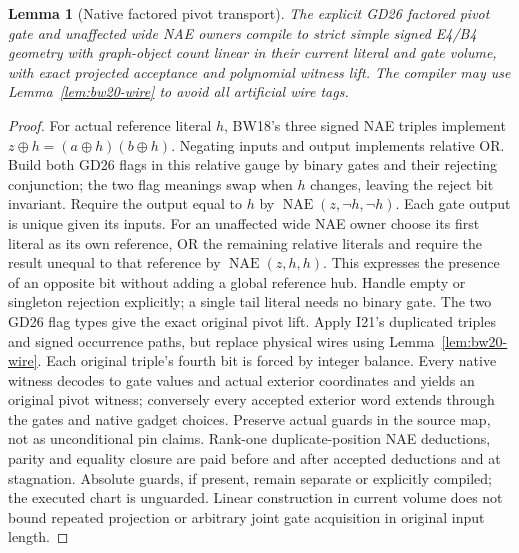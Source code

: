 \documentclass[11pt]{article}
\newtheorem{lemma}[theorem]{Lemma}
\begin{document}
\begin{lemma}[Native factored pivot transport]\label{lem:bw20-gate}
The explicit GD26 factored pivot gate and unaffected wide NAE owners compile to strict simple signed E4/B4 geometry with graph-object count linear in their current literal and gate volume, with exact projected acceptance and polynomial witness lift. The compiler may use Lemma~\ref{lem:bw20-wire} to avoid all artificial wire tags.
\end{lemma}
\begin{proof}
For actual reference literal $h$, BW18's three signed NAE triples implement $z\oplus h=(a\oplus h)(b\oplus h)$. Negating inputs and output implements relative OR. Build both GD26 flags in this relative gauge by binary gates and their rejecting conjunction; the two flag meanings swap when $h$ changes, leaving the reject bit invariant. Require the output equal to $h$ by $\operatorname{NAE}(z,\neg h,\neg h)$. Each gate output is unique given its inputs. For an unaffected wide NAE owner choose its first literal as its own reference, OR the remaining relative literals and require the result unequal to that reference by $\operatorname{NAE}(z,h,h)$. This expresses the presence of an opposite bit without adding a global reference hub. Handle empty or singleton rejection explicitly; a single tail literal needs no binary gate. The two GD26 flag types give the exact original pivot lift. Apply I21's duplicated triples and signed occurrence paths, but replace physical wires using Lemma~\ref{lem:bw20-wire}. Each original triple's fourth bit is forced by integer balance. Every native witness decodes to gate values and actual exterior coordinates and yields an original pivot witness; conversely every accepted exterior word extends through the gates and native gadget choices. Preserve actual guards in the source map, not as unconditional pin claims. Rank-one duplicate-position NAE deductions, parity and equality closure are paid before and after accepted deductions and at stagnation. Absolute guards, if present, remain separate or explicitly compiled; the executed chart is unguarded. Linear construction in current volume does not bound repeated projection or arbitrary joint gate acquisition in original input length.
\end{proof}
\end{document}
